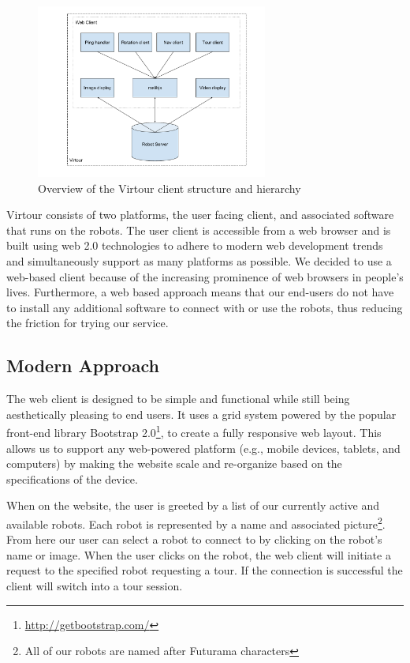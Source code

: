 \documentclass[
  oneside,
  11pt, a4paper,
  footinclude=true,
  headinclude=true,
  cleardoublepage=empty
]{article}
\begin{document}
\begin{figure}
  \centering
  \includegraphics[width=3in]{virtour_client}
  \caption{Overview of the Virtour client structure and hierarchy}
  \label{fig:client}
\end{figure}

Virtour consists of two platforms, the user facing client, and associated
software that runs on the robots. The user client is accessible from a web
browser and is built using web 2.0 technologies to adhere to modern web
development trends and simultaneously support as many platforms as possible. We
decided to use a web-based client because of the increasing prominence of web
browsers in people's lives. Furthermore, a web based approach means that our
end-users do not have to install any additional software to connect with or use
the robots, thus reducing the friction for trying our service.

\subsection{Modern Approach}

The web client is designed to be simple and functional while still being
aesthetically pleasing to end users. It uses a grid system powered by the
popular front-end library Bootstrap
2.0\footnote{\url{http://getbootstrap.com/}}, to create a fully responsive web
layout. This allows us to support any web-powered platform (e.g., mobile
devices, tablets, and computers) by making the website scale and re-organize
based on the specifications of the device.

When on the website, the user is greeted by a list of our currently active and
available robots. Each robot is represented by a name and associated
picture\footnote{All of our robots are named after Futurama characters}. From
here our user can select a robot to connect to by clicking on the robot's name
or image. When the user clicks on the robot, the web client will initiate a
request to the specified robot requesting a tour. If the connection is
successful the client will switch into a tour session.
\end{document}
